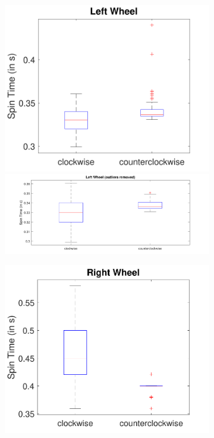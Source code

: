 \documentclass[a4paper,twoside]{book}
\begin{document}
\begin{figure}[h]
  \begin{subfigure}[t]{0.4\textwidth}
  \includegraphics[width=\textwidth, center]{img/left}\\[1cm]
  \includegraphics[width=\textwidth, center]{img/left2}
  \end{subfigure}
  \quad
  \begin{subfigure}[t]{0.4\textwidth} 
  \includegraphics[width=\textwidth, center]{img/right}\\[1cm]

\end{subfigure}
\end{figure}
\end{document}
